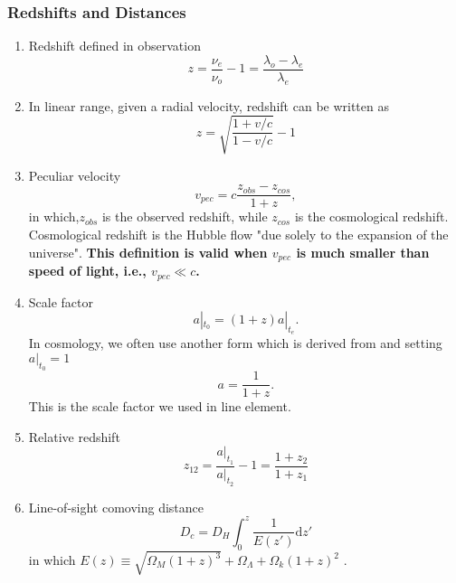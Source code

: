 \subsubsection{Redshifts and Distances}

\begin{enumerate}
\item
Redshift defined in observation
\begin{equation}
	z = \frac{\nu_e}{\nu_o} -1 = \frac{\lambda_o-\lambda_e}{\lambda_e}
\end{equation}

\item
In linear range, given a radial velocity, redshift can be written as
\begin{equation}
	z = \sqrt{\frac{1 + v/c}{1 - v/c}} - 1
\end{equation}

\item
Peculiar velocity
\begin{equation}
	v_{pec} = c \frac {z_{obs} - z_{cos} }{ 1+z }  ,
\end{equation}
in which,$z_{obs}$ is the observed redshift, while $z_{cos}$ is the cosmological redshift. Cosmological redshift is the Hubble flow "due solely to the expansion of the universe".
{\bf This definition is valid when $v_{pec}$ is much smaller than speed of light, i.e., $v_{pec}\ll c$.}

\item
Scale factor
\begin{equation}
	a|_{t_0} = (1+z) a|_{t_e}  \label{eq-co-dis-scale_factor}  .
\end{equation}
In cosmology, we often use another form which is derived from \label{eq-co-dis-scale_factor} and setting $a|_{t_0}= 1$
\begin{equation}
	a = \frac 1{1+z}     .
\end{equation}
This is the scale factor we used in line element.

\item
Relative redshift
\begin{equation}
	z_{12} = \frac{a|_{t_1}}{a|_{t_2}}-1 = \frac{1+z_2}{1+z_1}
\end{equation}

\item
Line-of-sight comoving distance
\begin{equation}
	D_c = D_H\int^z_0 \frac{1}{E(z')}\mathrm dz'
\end{equation}
in which $E(z) \equiv \sqrt{\Omega_M (1+z)^3} + \Omega_\Lambda + \Omega_k (1+z)^2$    .


\end{enumerate}
